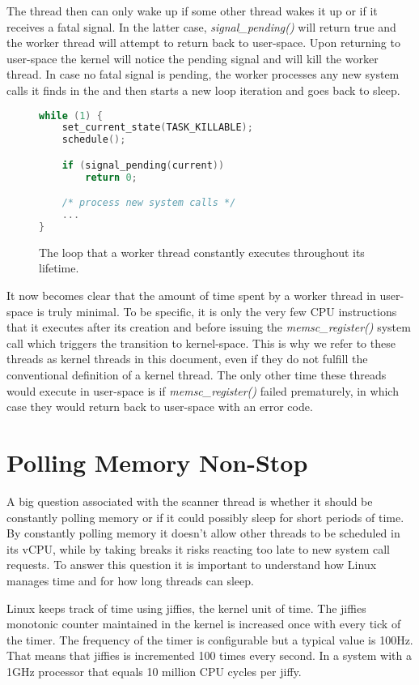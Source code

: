 The thread then can only wake up if some other thread wakes it up or if it
receives a fatal signal. In the latter case, \emph{signal\_pending()} will
return true and the worker thread will attempt to return back to user-space.
Upon returning to user-space the kernel will notice the pending signal and will
kill the worker thread. In case no fatal signal is pending, the worker
processes any new system calls it finds in the \sysp and then starts a new loop
iteration and goes back to sleep.

\begin{figure}[h]
    \begin{lstlisting}[language=C]
while (1) {
	set_current_state(TASK_KILLABLE);
	schedule();

	if (signal_pending(current))
		return 0;

	/* process new system calls */
	...
}
    \end{lstlisting}
    \caption{The loop that a \memsc worker thread constantly executes
    throughout its lifetime.}
    \label{fig:kernel forever}
\end{figure}

It now becomes clear that the amount of time spent by a \memsc worker thread in
user-space is truly minimal. To be specific, it is only the very few CPU
instructions that it executes after its creation and before issuing the
\emph{memsc\_register()} system call which triggers the transition to
kernel-space. This is why we refer to these threads as kernel threads in this
document, even if they do not fulfill the conventional definition of a kernel
thread. The only other time these threads would execute in user-space is if
\emph{memsc\_register()} failed prematurely, in which case they would return
back to user-space with an error code.

\section{Polling Memory Non-Stop}

A big question associated with the scanner thread is whether it should be
constantly polling memory or if it could possibly sleep for short periods of
time. By constantly polling memory it doesn't allow other threads to be
scheduled in its vCPU, while by taking breaks it risks reacting too late to new
system call requests. To answer this question it is important to understand how
Linux manages time and for how long threads can sleep.

Linux keeps track of time using jiffies, the kernel unit of time. The jiffies
monotonic counter maintained in the kernel is increased once with every tick of
the timer. The frequency of the timer is configurable but a typical value is
100Hz. That means that jiffies is incremented 100 times every second. In a
system with a 1GHz processor that equals 10 million CPU cycles per jiffy.

